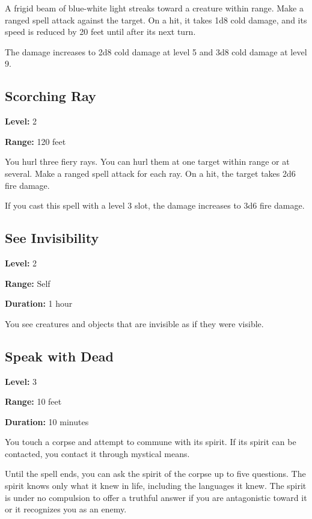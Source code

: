 \documentclass[12pt,letterpaper,twocolumn,openany,nodeprecatedcode,bg=none]{dndbook}
\let\oldsubsection\subsection
\renewcommand{\subsection}[1]{%
  \needspace{5\baselineskip}%
  \oldsubsection{#1}%
}
\begin{document}
A frigid beam of blue-white light streaks toward a creature within
range. Make a ranged spell attack against the target. On a hit, it takes
1d8 cold damage, and its speed is reduced by 20 feet until after its
next turn.

The damage increases to 2d8 cold damage at level 5 and 3d8 cold damage
at level 9.

\subsection{Scorching Ray}\label{scorching-ray}

\textbf{Level:} 2

\textbf{Range:} 120 feet

You hurl three fiery rays. You can hurl them at one target within range
or at several. Make a ranged spell attack for each ray. On a hit, the
target takes 2d6 fire damage.

If you cast this spell with a level 3 slot, the damage increases to 3d6
fire damage.

\subsection{See Invisibility}\label{see-invisibility}

\textbf{Level:} 2

\textbf{Range:} Self

\textbf{Duration:} 1 hour

You see creatures and objects that are invisible as if they were
visible.

\subsection{Speak with Dead}\label{speak-with-dead}

\textbf{Level:} 3

\textbf{Range:} 10 feet

\textbf{Duration:} 10 minutes

You touch a corpse and attempt to commune with its spirit. If its spirit
can be contacted, you contact it through mystical means.

Until the spell ends, you can ask the spirit of the corpse up to five
questions. The spirit knows only what it knew in life, including the
languages it knew. The spirit is under no compulsion to offer a truthful
answer if you are antagonistic toward it or it recognizes you as an
enemy.
\end{document}
